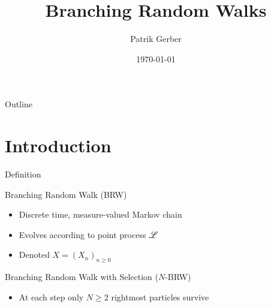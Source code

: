 \documentclass{beamer}
\title{Branching Random Walks}
\author{Patrik Gerber}
\institute{supervised by Prof. Julien Berestycki}
\date{\today}
\begin{document}
\begin{frame}
  \titlepage
\end{frame}

\begin{frame}{Outline}
 \tableofcontents
\end{frame}









\section{Introduction}
\begin{frame}{Definition}
\begin{block}{Branching Random Walk (BRW)}
\begin{itemize}
\item Discrete time, measure-valued Markov chain
\item Evolves according to point process $\mathscr{L}$
\item Denoted $X = (X_n)_{n \geq 0}$
\end{itemize}
\end{block}

\begin{block}{Branching Random Walk with Selection ($N$-BRW)}
\begin{itemize}
\item At each step only $N \geq 2$ rightmost particles survive
\end{itemize}
\end{block}
\end{frame}
\end{document}
